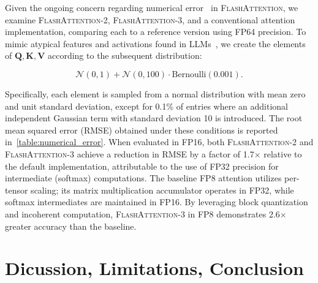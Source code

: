 \begin{itemize}
Given the ongoing concern regarding numerical error~\citep{golden2024flash} in
\textsc{FlashAttention}, we examine \textsc{FlashAttention-2}, \textsc{FlashAttention-3}, and a conventional attention implementation, comparing each to a reference version using FP64 precision. To mimic atypical features and activations found in LLMs~\citep{dettmers2208llm, sun2024massive}, we create the elements of $\mathbf{Q}, \mathbf{K}, \mathbf{V}$ according to the subsequent distribution:

\begin{equation*}
  \mathcal{N}(0, 1) + \mathcal{N}(0, 100) \cdot \mathrm{Bernoulli}(0.001).
\end{equation*}

Specifically, each element is sampled from a normal distribution with mean zero and unit standard deviation, except for 0.1\% of entries where an additional independent Gaussian term with standard deviation 10 is introduced. The root mean squared error (RMSE) obtained under these conditions is reported in~\cref{table:numerical_error}. When evaluated in FP16, both \textsc{FlashAttention-2} and \textsc{FlashAttention-3} achieve a reduction in RMSE by a factor of 1.7$\times$ relative to the default implementation, attributable to the use of FP32 precision for intermediate (softmax) computations. The baseline FP8 attention utilizes per-tensor scaling; its matrix multiplication accumulator operates in FP32, while softmax intermediates are maintained in FP16. By leveraging block quantization and incoherent computation, \textsc{FlashAttention-3} in FP8 demonstrates 2.6$\times$ greater accuracy than the baseline.

\section{Dicussion, Limitations, Conclusion}
\label{sec:discussion}


\end{itemize}
